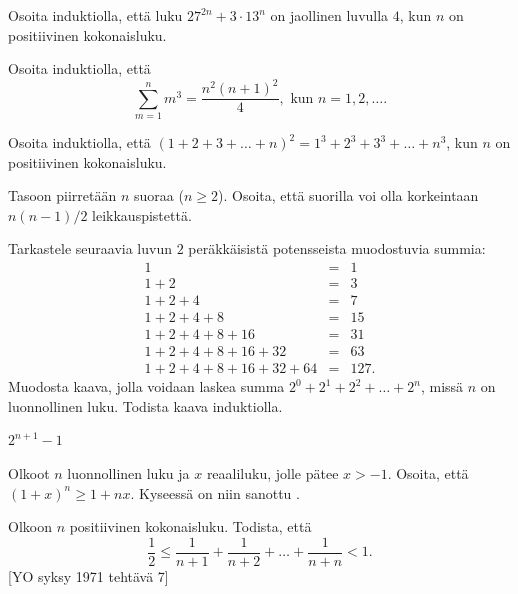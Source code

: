 \begin{kotitehtavasivu}
\begin{tehtava}
	Osoita induktiolla, että luku $27^{2n} + 3 \cdot 13^{n}$ on jaollinen luvulla $4$, kun $n$ on positiivinen kokonaisluku.
\end{tehtava}

\begin{tehtava}
	Osoita induktiolla, että
	\[
	\sum_{m=1}^n m^3= \frac{n^2(n+1)^2}{4}, \textrm{ kun } n=1, 2, \ldots.
	\]
\end{tehtava}

\begin{tehtava}
	Osoita induktiolla, että $(1 + 2 + 3 +\ldots + n)^2 = 1^3 + 2^3 + 3^3 + \ldots + n^3$, kun $n$ on positiivinen kokonaisluku.
\end{tehtava}

\begin{tehtava}
	Tasoon piirretään $n$ suoraa ($n\ge 2$). Osoita, että suorilla voi olla korkeintaan $n(n - 1)/2$ leikkauspistettä.
\end{tehtava}

\begin{tehtava}
	Tarkastele seuraavia luvun $2$ peräkkäisistä potensseista muodostuvia summia:
	\[
	\begin{array}{rcl}
	1 &=& 1\\
	1 + 2 &=& 3\\
	1 + 2 + 4 &=& 7\\
	1 + 2 + 4 + 8 &=& 15\\
	1 + 2 + 4 + 8 + 16 &=& 31\\
	1 + 2 + 4 + 8 + 16 + 32 &=& 63\\
	1 + 2 + 4 + 8 + 16 + 32 + 64 &=& 127.
	\end{array}
	\]
	Muodosta kaava, jolla voidaan laskea summa $2^0 + 2^1 + 2^2 + \ldots + 2^n$, missä $n$ on luonnollinen luku. Todista kaava induktiolla.
	
	\begin{vastaus}
		$2^{n+1}-1$
	\end{vastaus}
\end{tehtava}

\begin{tehtava}
	Olkoot $n$ luonnollinen luku ja $x$ reaaliluku, jolle pätee $x > -1$. Osoita, että $(1 + x)^n \ge 1 + nx$. Kyseessä on niin sanottu .
\end{tehtava}

\begin{tehtava}
	Olkoon $n$ positiivinen kokonaisluku. Todista, että
	\[
	\frac{1}{2}\le\frac{1}{n+1}+\frac{1}{n+2}+\ldots +\frac{1}{n+n} <1.
	\]
	[YO syksy 1971 tehtävä 7]
\end{tehtava}


\end{kotitehtavasivu}
